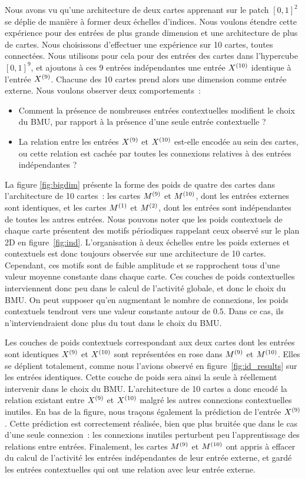 \documentclass[../main]{subfiles}
\begin{document}
Nous avons vu qu'une architecture de deux cartes apprenant sur le patch $[0,1]^2$ se déplie de manière à former deux échelles d'indices. 
Nous voulons étendre cette expérience pour des entrées de plus grande dimension et une architecture de plus de cartes. 
Nous choisissons d'effectuer une expérience sur 10 cartes, toutes connectées.
Nous utilisons pour cela pour des entrées des cartes dans l'hypercube $[0,1]^9$, et ajoutons à ces $9$ entrées indépendantes une entrée $X^{({10})}$ identique à l'entrée $X^{({9})}$. Chacune des 10 cartes prend alors une dimension comme entrée externe.
Nous voulons observer deux comportements~:
\begin{itemize}
	\item Comment la présence de nombreuses entrées contextuelles modifient le choix du BMU, par rapport à la présence d'une seule entrée contextuelle ? 
	\item La relation entre les entrées $X^{({9})}$ et $X^{({10})}$ est-elle encodée au sein des cartes, ou cette relation est \og cachée \fg{} par toutes les connexions relatives à des entrées indépendantes ? 
\end{itemize}

La figure \ref{fig:bigdim} présente la forme des poids de quatre des cartes dans l'architecture de 10 cartes~: les cartes $M^{({9})}$ et $M^{({10})}$, dont les entrées externes sont identiques, et les cartes $M^{({1})}$ et $M^{({2})}$, dont les entrées sont indépendantes de toutes les autres entrées.
Nous pouvons noter que les poids contextuels de chaque carte présentent des motifs périodiques rappelant ceux observé sur le plan 2D en figure~\ref{fig:ind}. L'organisation à deux échelles entre les poids externes et contextuels est donc toujours observée sur une architecture de 10 cartes.
Cependant, ces motifs sont de faible amplitude et se rapprochent tous d'une valeur moyenne constante dans chaque carte. Ces couches de poids contextuelles interviennent donc peu dans le calcul de l'activité globale, et donc le choix du BMU. On peut supposer qu'en augmentant le nombre de connexions, les poids contextuels tendront vers une valeur constante autour de $0.5$. Dans ce cas, ils n'interviendraient donc plus du tout dans le choix du BMU.

Les couches de poids contextuels correspondant aux deux cartes dont les entrées sont identiques $X^{({9})}$ et $X^{({10})}$ sont représentées en rose dans $M^{({9})}$ et $M^{({10})}$. 
Elles se déplient totalement, comme nous l'avions observé en figure~\ref{fig:id_results} sur les entrées identiques. Cette couche de poids sera ainsi la seule à réellement intervenir dans le choix du BMU. L'architecture de 10 cartes a donc encodé la relation existant entre $X^{({9})}$ et $X^{({10})}$ malgré les autres connexions contextuelles inutiles.
En bas de la figure, nous traçons également la prédiction de l'entrée $X^{({9})}$.
Cette prédiction est correctement réalisée, bien que plus bruitée que dans le cas d'une seule connexion~: les connexions inutiles  perturbent peu l'apprentissage des relations entre entrées. 
Finalement, les cartes $M^{({9})}$ et $M^{({10})}$ ont appris à effacer du calcul de l'activité les entrées indépendantes de leur entrée externe, et gardé les entrées contextuelles qui ont une relation avec leur entrée externe.
\end{document}
